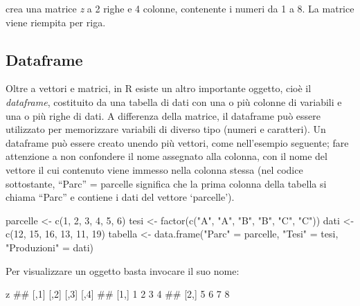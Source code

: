 \documentclass[a4paper,12pt,oneside]{book}
\newenvironment{Shaded}{\begin{snugshade}}{\end{snugshade}}
\newcommand{\DecValTok}[1]{#1}
\newcommand{\StringTok}[1]{#1}
\newcommand{\DocumentationTok}[1]{#1}
\newcommand{\OtherTok}[1]{#1}
\newcommand{\FunctionTok}[1]{#1}
\newcommand{\NormalTok}[1]{#1}
\begin{document}
crea una matrice \emph{z} a 2 righe e 4 colonne, contenente i numeri da 1 a 8. La matrice viene riempita per riga.

\hypertarget{dataframe}{%
\subsection{Dataframe}\label{dataframe}}

Oltre a vettori e matrici, in R esiste un altro importante oggetto, cioè il \emph{dataframe}, costituito da una tabella di dati con una o più colonne di variabili e una o più righe di dati. A differenza della matrice, il dataframe può essere utilizzato per memorizzare variabili di diverso tipo (numeri e caratteri). Un dataframe può essere creato unendo più vettori, come nell'esempio seguente; fare attenzione a non confondere il nome assegnato alla colonna, con il nome del vettore il cui contenuto viene immesso nella colonna stessa (nel codice sottostante, ``Parc'' = parcelle significa che la prima colonna della tabella si chiama ``Parc'' e contiene i dati del vettore `parcelle').

\begin{Shaded}
\begin{Highlighting}[]
\NormalTok{parcelle  }\OtherTok{\textless{}{-}}  \FunctionTok{c}\NormalTok{(}\DecValTok{1}\NormalTok{, }\DecValTok{2}\NormalTok{, }\DecValTok{3}\NormalTok{, }\DecValTok{4}\NormalTok{, }\DecValTok{5}\NormalTok{, }\DecValTok{6}\NormalTok{)}
\NormalTok{tesi  }\OtherTok{\textless{}{-}}  \FunctionTok{factor}\NormalTok{(}\FunctionTok{c}\NormalTok{(}\StringTok{"A"}\NormalTok{, }\StringTok{"A"}\NormalTok{, }\StringTok{"B"}\NormalTok{, }\StringTok{"B"}\NormalTok{, }\StringTok{"C"}\NormalTok{, }\StringTok{"C"}\NormalTok{))}
\NormalTok{dati  }\OtherTok{\textless{}{-}}  \FunctionTok{c}\NormalTok{(}\DecValTok{12}\NormalTok{, }\DecValTok{15}\NormalTok{, }\DecValTok{16}\NormalTok{, }\DecValTok{13}\NormalTok{, }\DecValTok{11}\NormalTok{, }\DecValTok{19}\NormalTok{)}
\NormalTok{tabella  }\OtherTok{\textless{}{-}}  \FunctionTok{data.frame}\NormalTok{(}\StringTok{"Parc"} \OtherTok{=}\NormalTok{ parcelle, }\StringTok{"Tesi"} \OtherTok{=}\NormalTok{ tesi,}
                        \StringTok{"Produzioni"} \OtherTok{=}\NormalTok{ dati)}
\end{Highlighting}
\end{Shaded}

Per visualizzare un oggetto basta invocare il suo nome:

\begin{Shaded}
\begin{Highlighting}[]
\NormalTok{z}
\DocumentationTok{\#\#      [,1] [,2] [,3] [,4]}
\DocumentationTok{\#\# [1,]    1    2    3    4}
\DocumentationTok{\#\# [2,]    5    6    7    8}
\end{Highlighting}
\end{Shaded}
\end{document}

